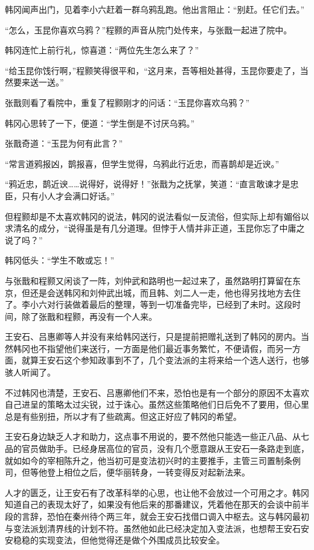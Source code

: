 韩冈闻声出门，见着李小六赶着一群乌鸦乱跑。他出言阻止：“别赶。任它们去。”

“怎么，玉昆你喜欢乌鸦？”程颢的声音从院门处传来，与张戬一起进了院中。

韩冈连忙上前行礼，惊喜道：“两位先生怎么来了？”

“给玉昆你饯行啊，”程颢笑得很平和，“这月来，吾等相处甚得，玉昆你要走了，当然要来送一送。”

张戬则看了看院中，重复了程颢刚才的问话：“玉昆你喜欢乌鸦？”

韩冈心思转了一下，便道：“学生倒是不讨厌乌鸦。”

张戬奇道：“玉昆为何有此言？”

“常言道鸦报凶，鹊报喜，但学生觉得，乌鸦此行近忠，而喜鹊却是近谀。”

“鸦近忠，鹊近谀……说得好，说得好！”张戬为之抚掌，笑道：“直言敢谏才是忠臣，只有小人才会满口好话。”

但程颢却是不太喜欢韩冈的说法，韩冈的说法看似一反流俗，但实际上却有媚俗以求清名的成分，“说得虽是有几分道理。但悖于人情并非正道，玉昆你忘了中庸之说了吗？”

韩冈低头：“学生不敢或忘！”

与张戬和程颢又闲谈了一阵，刘仲武和路明也一起过来了，虽然路明打算留在东京，但还是会送韩冈和刘仲武出城，而且韩、刘二人一走，他也得另找地方去住了。李小六对行装做着最后的整理，等到一切准备完毕，已经到了未时。这段时间，除了张戬和程颢，再没有一个人来。

王安石、吕惠卿等人并没有来给韩冈送行，只是提前把赠礼送到了韩冈的房内。当然韩冈也不指望他们来送行，一方面是他们最近事务繁忙，不便请假，而另一方面，就算王安石这个参知政事到不了，几个变法派的主将来给一个选人送行，也够骇人听闻了。

不过韩冈也清楚，王安石、吕惠卿他们不来，恐怕也是有一个部分的原因不太喜欢自己进呈的策略太过尖锐，过于诛心。虽然这些策略他们日后免不了要用，但心里总是有些别扭，所以才有了些疏离。但这正好应了韩冈的希望。

王安石身边缺乏人才和助力，这点事不用说的，要不然他只能选一些正八品、从七品的官员做助手。已经身居高位的官员，没有几个愿意跟从王安石一条路走到底，就如如今的宰相陈升之，他当初可是变法初兴时的主要推手，主管三司置制条例司，但等他登上相位之后，便华丽转身，一转变得反对起新法来。

人才的匮乏，让王安石有了改革科举的心思，也让他不会放过一个可用之才。韩冈知道自己的表现太好了，如果没有他后来的那番建议，凭着他在那天的会谈中前半段的言辞，恐怕在秦州待个两三年，就会王安石找借口调入中枢去。这与韩冈最初与变法派划清界线的计划不符。虽然他如此已经决定加入变法派，也想帮王安石安安稳稳的实现变法，但他觉得还是做个外围成员比较安全。


